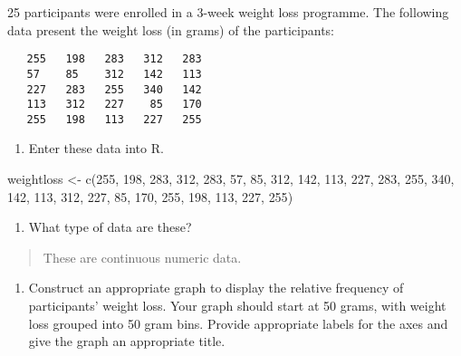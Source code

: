 \documentclass[
]{memoir}
\newenvironment{Shaded}{\begin{snugshade}}{\end{snugshade}}
\newcommand{\DecValTok}[1]{\textcolor[rgb]{0.00,0.00,0.81}{#1}}
\newcommand{\FunctionTok}[1]{\textcolor[rgb]{0.00,0.00,0.00}{#1}}
\newcommand{\NormalTok}[1]{#1}
\newcommand{\OtherTok}[1]{\textcolor[rgb]{0.56,0.35,0.01}{#1}}
\providecommand{\tightlist}{%
  \setlength{\itemsep}{0pt}\setlength{\parskip}{0pt}}
\begin{document}
25 participants were enrolled in a 3-week weight loss programme. The following data present the weight loss (in grams) of the participants:

\begin{verbatim}
   255   198   283   312   283
   57    85    312   142   113
   227   283   255   340   142
   113   312   227    85   170
   255   198   113   227   255
\end{verbatim}

\begin{enumerate}
\def\labelenumi{\alph{enumi})}
\tightlist
\item
  Enter these data into R.
\end{enumerate}

\begin{Shaded}
\begin{Highlighting}[]
\NormalTok{weightloss }\OtherTok{\textless{}{-}} \FunctionTok{c}\NormalTok{(}\DecValTok{255}\NormalTok{, }\DecValTok{198}\NormalTok{, }\DecValTok{283}\NormalTok{, }\DecValTok{312}\NormalTok{, }\DecValTok{283}\NormalTok{, }\DecValTok{57}\NormalTok{,  }\DecValTok{85}\NormalTok{, }\DecValTok{312}\NormalTok{, }\DecValTok{142}\NormalTok{, }\DecValTok{113}\NormalTok{,}
                \DecValTok{227}\NormalTok{, }\DecValTok{283}\NormalTok{, }\DecValTok{255}\NormalTok{, }\DecValTok{340}\NormalTok{, }\DecValTok{142}\NormalTok{, }\DecValTok{113}\NormalTok{, }\DecValTok{312}\NormalTok{, }\DecValTok{227}\NormalTok{,  }\DecValTok{85}\NormalTok{, }\DecValTok{170}\NormalTok{,}
                \DecValTok{255}\NormalTok{, }\DecValTok{198}\NormalTok{, }\DecValTok{113}\NormalTok{, }\DecValTok{227}\NormalTok{, }\DecValTok{255}\NormalTok{)}
\end{Highlighting}
\end{Shaded}

\begin{enumerate}
\def\labelenumi{\alph{enumi})}
\setcounter{enumi}{1}
\tightlist
\item
  What type of data are these?
\end{enumerate}

\begin{quote}
These are continuous numeric data.
\end{quote}

\begin{enumerate}
\def\labelenumi{\alph{enumi})}
\setcounter{enumi}{2}
\tightlist
\item
  Construct an appropriate graph to display the relative frequency of participants' weight loss. Your graph should start at 50 grams, with weight loss grouped into 50 gram bins. Provide appropriate labels for the axes and give the graph an appropriate title.
\end{enumerate}
\end{document}
